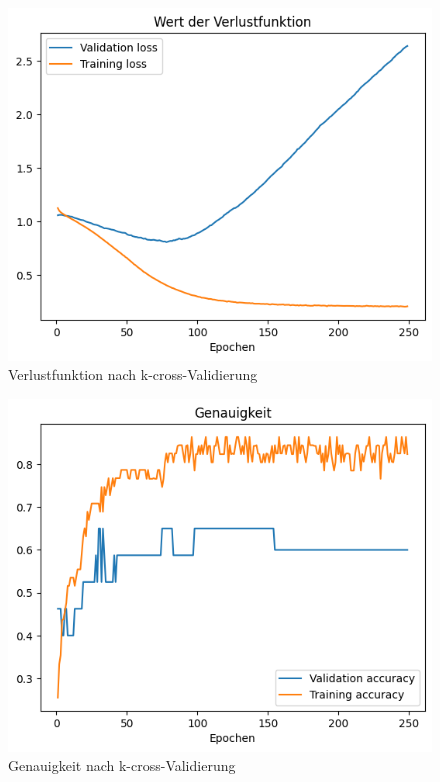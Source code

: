 \begin{figure}[H]
    \centering
    \includegraphics[width=.75\textwidth]{abbildungen/kCrossLoss.png}
    \caption{Verlustfunktion nach k-cross-Validierung}
    \label{fig:kCrossLoss}
\end{figure}
\begin{figure}[H]
    \centering
    \includegraphics[width=.75\textwidth]{abbildungen/kCrossAcc.png}
    \caption{Genauigkeit nach k-cross-Validierung}
    \label{fig:kCrossAcc}
\end{figure}